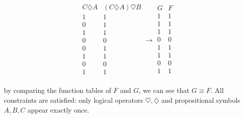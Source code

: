 \documentclass[unicode,11pt,a4paper,oneside,numbers=endperiod,openany]{scrartcl}
\newcommand{\myex}[3]{
    \ifthenelse{\equal{#1}{true}}{
        \begin{equation} \label{#2} \begin{aligned} #3 \end{aligned} \end{equation}
    }{
        \begin{equation*} \label{#2} \begin{aligned} #3 \end{aligned} \end{equation*}
    }
}
\begin{document}
\[
\begin{array}{c|c}
C \diamondsuit A & (C \diamondsuit A) \heartsuit B \\
\hline
1 & 1 \\
0 & 1 \\
1 & 1 \\
0 & 0 \\
0 & 1 \\
1 & 1 \\
0 & 0 \\
1 & 1 \\
\end{array}
\longrightarrow
\begin{array}{c|c}
G & F \\
\hline
1 & 1 \\
1 & 1 \\
1 & 1 \\
0 & 0 \\
1 & 1 \\
1 & 1 \\
0 & 0 \\
1 & 1 \\
\end{array}
\]

by comparing the function tables of \( F \) and \( G \), 
we can see that \( G \equiv F \). 
All constraints are satisfied: only logical operators \( \heartsuit, \diamondsuit \)
and propositional symbols \( A, B, C \) appear exactly once.







\end{document}
